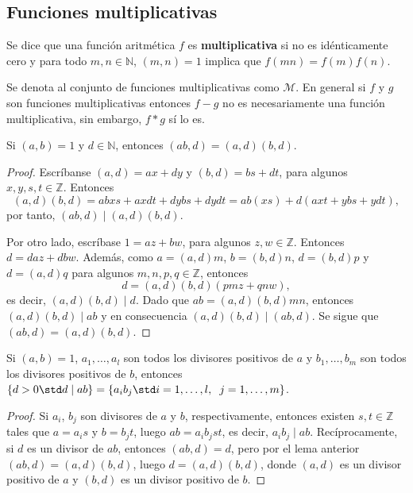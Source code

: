 \subsection{Funciones multiplicativas}

\begin{definition}
Se dice que una función aritmética $f$ es \textbf{multiplicativa} si no es idénticamente cero y para todo $m,n \in \mathbb{N}$, $(m,n)=1$ implica que $f(m n)=f(m)f(n)$.
\end{definition}

\begin{remark}
Se denota al conjunto de funciones multiplicativas como $\mathcal{M}$. En general si $f$ y $g$ son funciones multiplicativas entonces $f-g$ no es necesariamente una función multiplicativa, sin embargo, $f*g$ sí lo es.
\end{remark}

\begin{lemma}
Si $(a,b)=1$ y $d \in \mathbb{N}$, entonces $(a b,d)=(a,d)(b,d)$.
\end{lemma}
\begin{proof}
Escríbanse $(a,d)=a x+d y$ y $(b,d)=b s+d t$, para algunos $x,y,s,t \in \mathbb{Z}$. Entonces
\begin{equation*}
	(a,d)(b,d) = a b x s + a x d t + d y b s + d y d t = a b (xs) + d(a x t + y b s + y d t),
\end{equation*}
por tanto, $(a b,d) \mid (a,d)(b,d)$. 
\bigskip

Por otro lado, escríbase $1=a z + b w$, para algunos $z,w \in \mathbb{Z}$. Entonces $d=d a z + d b w$. Además, como $a=(a,d)m$, $b=(b,d)n$, $d=(b,d)p$ y $d=(a,d)q$ para algunos $m,n,p,q \in \mathbb{Z}$, entonces
\begin{equation*}
    d = (a,d)(b,d) (p m z + q n w),
\end{equation*}
es decir, $(a,d)(b,d) \mid d$. Dado que $a b=(a,d)(b,d)m n$, entonces $(a,d)(b,d) \mid a b$ y en consecuencia $(a,d)(b,d) \mid (a b,d)$. Se sigue que $(a b,d)=(a,d)(b,d)$.
\end{proof}

\begin{lemma}\label{lem:div1}
Si $(a,b)=1$, $a_1,\ldots,a_l$ son todos los divisores positivos de $a$ y $b_1,\ldots,b_m$ son todos los divisores positivos de $b$, entonces $\{ d>0 \std d \mid a b \}=\{ a_i b_j \std i=1,\ldots,l, \hspace{0.2cm} j=1,\ldots,m \}$.
\end{lemma}
\begin{proof}
Si $a_i$, $b_j$ son divisores de $a$ y $b$, respectivamente, entonces existen $s,t \in \mathbb{Z}$ tales que $a=a_i s$ y $b=b_j t$, luego $a b=a_i b_j s t$, es decir, $a_i b_j \mid a b$. Recíprocamente, si $d$ es un divisor de $a b$, entonces $(a b,d)=d$, pero por el lema anterior $(a b,d)=(a,d)(b,d)$, luego $d=(a,d)(b,d)$, donde $(a,d)$ es un divisor positivo de $a$ y $(b,d)$ es un divisor positivo de $b$.
\end{proof}

